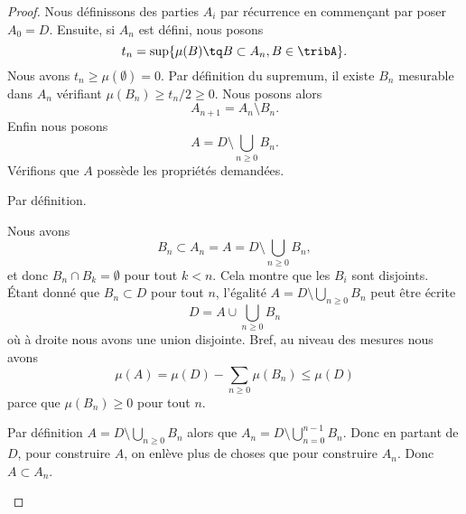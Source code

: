 					 \begin{proof}
					 Nous définissons des parties \( A_i\) par récurrence en commençant par poser \( A_0=D\). Ensuite, si \( A_n\) est défini, nous posons
					 \begin{equation}
					 t_n=\sup\{ \mu(B)\tq B\subset A_n, B\in\tribA \}.
					 \end{equation}
					 Nous avons \( t_n\geq \mu(\emptyset)=0\). Par définition du supremum, il existe \( B_n\) mesurable dans \( A_n\) vérifiant \( \mu(B_n)\geq t_n/2\geq 0\). Nous posons alors
					 \begin{equation}
					 A_{n+1}=A_n\setminus B_n.
					 \end{equation}
					 Enfin nous posons
					 \begin{equation}
					 A=D\setminus \bigcup_{n\geq 0}B_n.
					 \end{equation}
					 Vérifions que \( A\) possède les propriétés demandées.
					 \begin{subproof}
					 \spitem[\( A\subset D\)]
					 Par définition.
					 \spitem[\( \mu(A)\leq \mu(D)\)]
					 \begin{subproof}
					 Nous avons
					 \begin{equation}
					 B_n\subset A_n= A=D\setminus \bigcup_{n\geq 0}B_n,
					 \end{equation}
					 et donc \( B_n\cap B_k=\emptyset\) pour tout \( k<n\). Cela montre que les \( B_i\) sont disjoints.
					 \spitem[\( \mu(A)\leq \mu(D)\)]
					 Étant donné que \( B_n\subset D\) pour tout \( n\), l'égalité \( A=D\setminus \bigcup_{n\geq 0} B_n\) peut être écrite
					 \begin{equation}
					 D=A\cup\bigcup_{n\geq 0}B_n
					 \end{equation}
					 où à droite nous avons une union disjointe. Bref, au niveau des mesures nous avons
					 \begin{equation}
\mu(A)=\mu(D)-\sum_{n\geq 0}\mu(B_n)\leq \mu(D)
	\end{equation}
	parce que \( \mu(B_n)\geq 0\) pour tout \( n\).
	\end{subproof}
	\spitem[\( A\subset A_n\)]
	Par définition \( A=D\setminus \bigcup_{n\geq 0}B_n\) alors que \( A_n=D\setminus\bigcup_{n=0}^{n-1}B_n\). Donc en partant de \( D\), pour construire \( A\), on enlève plus de choses que pour construire \( A_n\). Donc \( A\subset A_n\).

\end{subproof}
\end{proof}
